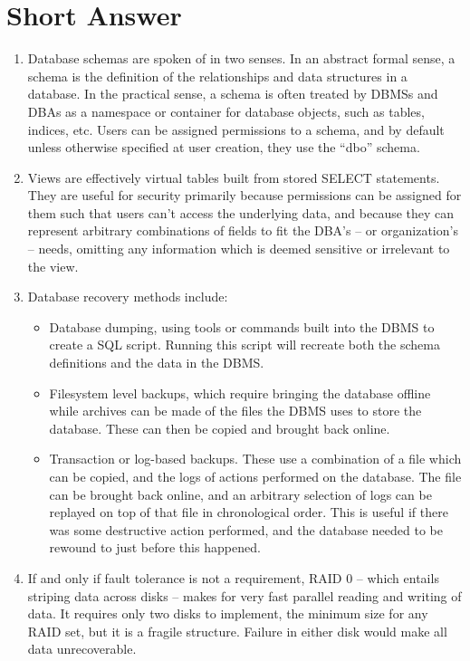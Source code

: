 \hypertarget{short-answer}{%
\section{Short Answer}\label{short-answer}}

\begin{enumerate}
\def\labelenumi{\arabic{enumi}.}
\item
  Database schemas are spoken of in two senses. In an abstract formal
  sense, a schema is the definition of the relationships and data
  structures in a database. In the practical sense, a schema is often
  treated by DBMSs and DBAs as a namespace or container for database
  objects, such as tables, indices, etc. Users can be assigned
  permissions to a schema, and by default unless otherwise specified at
  user creation, they use the ``dbo'' schema.
\item
  Views are effectively virtual tables built from stored SELECT
  statements. They are useful for security primarily because permissions
  can be assigned for them such that users can't access the underlying
  data, and because they can represent arbitrary combinations of fields
  to fit the DBA's -- or organization's -- needs, omitting any
  information which is deemed sensitive or irrelevant to the view.
\item
  Database recovery methods include:

  \begin{itemize}
  \item
    Database dumping, using tools or commands built into the DBMS to
    create a SQL script. Running this script will recreate both the
    schema definitions and the data in the DBMS.
  \item
    Filesystem level backups, which require bringing the database
    offline while archives can be made of the files the DBMS uses to
    store the database. These can then be copied and brought back
    online.
  \item
    Transaction or log-based backups. These use a combination of a file
    which can be copied, and the logs of actions performed on the
    database. The file can be brought back online, and an arbitrary
    selection of logs can be replayed on top of that file in
    chronological order. This is useful if there was some destructive
    action performed, and the database needed to be rewound to just
    before this happened.
  \end{itemize}
\item
  If and only if fault tolerance is not a requirement, RAID 0 -- which
  entails striping data across disks -- makes for very fast parallel
  reading and writing of data. It requires only two disks to implement,
  the minimum size for any RAID set, but it is a fragile structure.
  Failure in either disk would make all data unrecoverable.
\end{enumerate}

